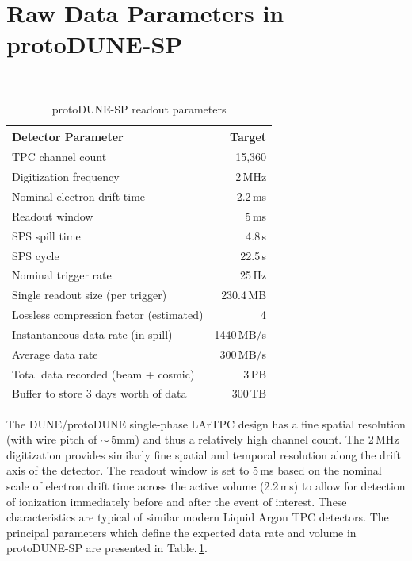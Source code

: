 \documentclass{PoS}
\newcommand{\pd}{protoDUNE\xspace}
\begin{document}
\section{Raw Data Parameters in protoDUNE-SP}
\label{sec:np04_data_rate}
\begin{table}
\begin{center}
\caption{\label{table:np04_data_rate}
  protoDUNE-SP readout parameters}
\ \\
\begin{tabularx}{0.75\textwidth}{ X  >{\setlength{\hsize}{0.8\hsize}}r}
\hline
Detector Parameter & Target \\
\hline
TPC channel count & 15,360 \\
Digitization frequency & 2\,MHz \\
Nominal electron drift time & 2.2\,ms\\
Readout window & 5\,ms \\
SPS spill time& 4.8\,s\\
SPS cycle& 22.5\,s\\
Nominal trigger rate & 25\,Hz \\
Single readout size (per trigger) & 230.4\,MB \\
Lossless compression factor (estimated) & 4 \\
Instantaneous data rate (in-spill) & 1440\,MB/s \\
Average data rate & 300\,MB/s \\
Total data recorded (beam + cosmic) & 3\,PB\\
Buffer to store 3 days worth of data & 300\,TB\\
\hline
\end{tabularx}
\end{center}
\end{table}

The DUNE/\pd single-phase LArTPC design has a fine spatial resolution (with wire pitch of $\sim$\,5mm)
and thus a relatively high channel count. The 2\,MHz digitization provides similarly fine spatial and
temporal resolution along the drift axis of the detector. The readout window is  set to 5\,ms 
based on the nominal scale of electron drift time across the active volume (2.2\,ms) to allow for detection
of ionization immediately before and after the event of interest.  These characteristics are typical of
similar modern Liquid Argon TPC detectors. The principal parameters which define the expected data rate and
volume in protoDUNE-SP are presented  in Table.\,\ref{table:np04_data_rate}.
\end{document}
